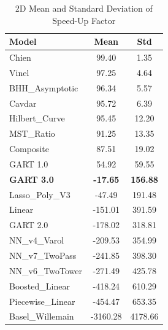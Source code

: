 \documentclass[11pt, a4paper]{article}
\begin{document}
\begin{table}[H]
    \centering
    \caption{2D Mean and Standard Deviation of Speed-Up Factor}
    \label{tab:2d_speedup}
    \begin{tabular}{lS[table-format=4.2]S[table-format=4.2]}
        \toprule
        \textbf{Model} & {\textbf{Mean}} & {\textbf{Std}} \\
        \midrule
        Chien & 99.40 & 1.35 \\
        Vinel & 97.25 & 4.64 \\
        BHH\_Asymptotic & 96.34 & 5.57 \\
        Cavdar & 95.72 & 6.39 \\
        Hilbert\_Curve & 95.45 & 12.20 \\
        MST\_Ratio & 91.25 & 13.35 \\
        Composite & 87.51 & 19.02 \\
        GART 1.0 & 54.92 & 59.55 \\
        \textbf{GART 3.0} & \textbf{-17.65} & \textbf{156.88} \\
        Lasso\_Poly\_V3 & -47.49 & 191.48 \\
        Linear & -151.01 & 391.59 \\
        GART 2.0 & -178.02 & 318.81 \\
        NN\_v4\_Varol & -209.53 & 354.99 \\
        NN\_v7\_TwoPass & -241.85 & 398.30 \\
        NN\_v6\_TwoTower & -271.49 & 425.78 \\
        Boosted\_Linear & -418.24 & 610.29 \\
        Piecewise\_Linear & -454.47 & 653.35 \\
        Basel\_Willemain & -3160.28 & 4178.66 \\
        \bottomrule
    \end{tabular}
\end{table}
\end{document}
